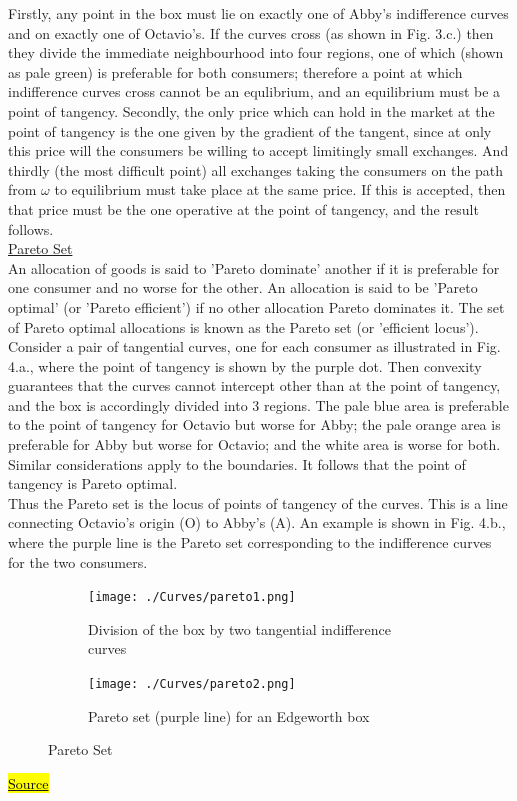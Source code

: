 \documentclass[a4paper, 12pt, reqno]{article}
\begin{document}
Firstly, any point in the box must lie on exactly one of Abby's indifference curves and on exactly one of Octavio's. If the curves cross (as shown in Fig. 3.c.) then they divide the immediate neighbourhood into four regions, 
one of which (shown as pale green) is preferable for both consumers; therefore a point at which indifference curves cross cannot be an equlibrium, and an equilibrium must be a point of tangency.
Secondly, the only price which can hold in the market at the point of tangency is the one given by the gradient of the tangent, since at only this price will the consumers be willing to accept limitingly small exchanges.
And thirdly (the most difficult point) all exchanges taking the consumers on the path from $\omega$ to equilibrium must take place at the same price. 
If this is accepted, then that price must be the one operative at the point of tangency, and the result follows. \\

\underline{Pareto Set} \\
An allocation of goods is said to 'Pareto dominate' another if it is preferable for one consumer and no worse for the other. An allocation is said to be 'Pareto optimal' (or 'Pareto efficient') if no other allocation Pareto dominates it. The set of Pareto optimal allocations is known as the Pareto 
set (or 'efficient locus'). \\
Consider a pair of tangential curves, one for each consumer as illustrated in Fig. 4.a., where the point of tangency is shown by the purple dot. Then convexity guarantees that the curves cannot intercept other than at the point of tangency, and the box is accordingly divided into 3 regions. The pale blue 
area is preferable to the point of tangency for Octavio but worse for Abby; the pale orange area is preferable for Abby but worse for Octavio; and the white area is worse for both. Similar 
considerations apply to the boundaries. It follows that the point of tangency is Pareto optimal. \\ 
Thus the Pareto set is the locus of points of tangency of the curves. This is a line connecting Octavio's origin (O) to Abby's (A). An example is shown in Fig. 4.b., where the purple line is the Pareto set corresponding to the indifference curves for the two consumers.
\begin{figure}[H]
    \centering
    \begin{subfigure}{0.4\textwidth}
        \texttt{[image: ./Curves/pareto1.png]}
        \caption{Division of the box by two tangential indifference curves}
        \label{fig:4a}
    \end{subfigure}
    \hfill
    \begin{subfigure}{0.4\textwidth}
        \texttt{[image: ./Curves/pareto2.png]}
        \caption{Pareto set (purple line) for an Edgeworth box}
        \label{fig:4b}
    \end{subfigure}
            
    \caption{Pareto Set}
    \label{fig:pareto curves}
\end{figure}

\href{https://en.wikipedia.org/wiki/Edgeworth_box}{\hl{Source}}

%

% 
%
\end{document}
